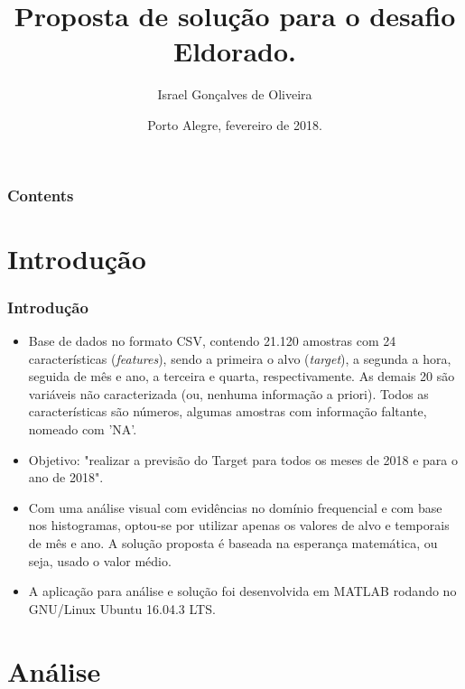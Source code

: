 \documentclass[xcolor=dvipsnames,xcolor=table]{beamer}
\title[Eldorado]{Proposta de solução para o desafio Eldorado.}
\author[prof.israel@gmail.com]{Israel Gon{\c c}alves de Oliveira}
\institute[Processo seletivo]{Instituto de Pesquisas Eldorado \\  Parque Científico e Tecnológico da PUCRS}
\date{Porto Alegre, fevereiro de 2018.}
\begin{document}
\begin{frame}
\titlepage
\end{frame}

\begin{frame}\frametitle{Contents}
{\footnotesize \tableofcontents}
\end{frame}



\section{Introdução}
\begin{frame}\frametitle{Introdução}

\begin{itemize}
\item Base de dados no formato CSV, contendo 21.120 amostras com 24 características (\emph{features}), sendo a primeira o alvo (\emph{target}), a segunda a hora, seguida de mês e ano, a terceira e quarta, respectivamente. As demais 20 são variáveis não caracterizada (ou, nenhuma informação a priori). Todos as características são números, algumas amostras com informação faltante, nomeado com 'NA'.
\item Objetivo: "realizar a previsão do Target para todos os meses de 2018 e para o
ano de 2018".
\item Com uma análise visual com evidências no domínio frequencial e com base nos histogramas, optou-se por utilizar apenas os valores de alvo e temporais de mês e ano. A solução proposta é baseada na esperança matemática, ou seja, usado o valor médio.
\item A aplicação para análise e solução foi desenvolvida em MATLAB \cite{MATLAB:2014} rodando no GNU/Linux Ubuntu 16.04.3 LTS.
\end{itemize}

\end{frame}


\section{Análise}
\end{document}
